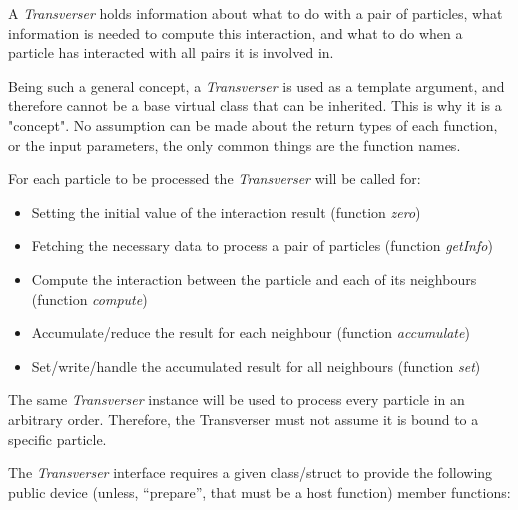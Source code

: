 \documentclass[ twoside,openright,titlepage,numbers=noenddot,%
headinclude,footinclude,cleardoublepage=empty,abstract=on,
BCOR=5mm,paper=b5,fontsize=11pt, dvipsnames
]{scrreprt}
\begin{document}
A \emph{Transverser} holds information about what to do with a pair of particles, what information is needed to compute this interaction, and what to do when a particle has interacted with all pairs it is involved in.  

Being such a general concept, a \emph{Transverser} is used as a template argument, and therefore cannot be a base virtual class that can be inherited. This is why it is a "concept". No assumption can be made about the return types of each function, or the input parameters, the only common things are the function names.  

For each particle to be processed the \emph{Transverser} will be called for: %
\begin{itemize}
\item Setting the initial value of the interaction result (function \emph{zero})
\item Fetching the necessary data to process a pair of particles  (function \emph{getInfo})
\item Compute the interaction between the particle  and each of its neighbours (function \emph{compute})
\item Accumulate/reduce  the result for each neighbour (function \emph{accumulate})
\item  Set/write/handle the accumulated result for all neighbours (function \emph{set})
 \end{itemize}
The same \emph{Transverser} instance will be used to process every particle in an arbitrary order. Therefore, the Transverser must not assume it is bound to a specific particle.

The \emph{Transverser} interface requires a given class/struct to provide the following public device (unless, ``prepare'', that must be a host function) member functions:
\end{document}
